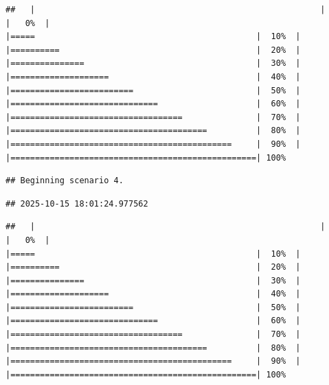 \documentclass[
]{article}
\begin{document}
\begin{verbatim}
##   |                                                          |                                                  |   0%  |                                                          |=====                                             |  10%  |                                                          |==========                                        |  20%  |                                                          |===============                                   |  30%  |                                                          |====================                              |  40%  |                                                          |=========================                         |  50%  |                                                          |==============================                    |  60%  |                                                          |===================================               |  70%  |                                                          |========================================          |  80%  |                                                          |=============================================     |  90%  |                                                          |==================================================| 100%
\end{verbatim}

\begin{verbatim}
## Beginning scenario 4.
\end{verbatim}

\begin{verbatim}
## 2025-10-15 18:01:24.977562
\end{verbatim}

\begin{verbatim}
##   |                                                          |                                                  |   0%  |                                                          |=====                                             |  10%  |                                                          |==========                                        |  20%  |                                                          |===============                                   |  30%  |                                                          |====================                              |  40%  |                                                          |=========================                         |  50%  |                                                          |==============================                    |  60%  |                                                          |===================================               |  70%  |                                                          |========================================          |  80%  |                                                          |=============================================     |  90%  |                                                          |==================================================| 100%
\end{verbatim}
\end{document}
